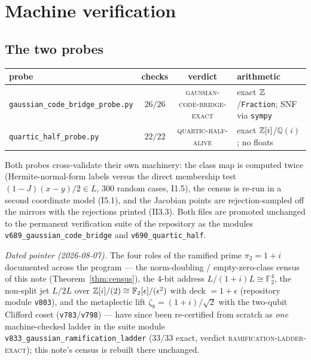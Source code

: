\section{Machine verification}\label{sec:verification}

\subsection{The two probes}
\begin{center}
\footnotesize
\setlength{\tabcolsep}{4pt}
\begin{tabular}{@{}lccl@{}}
\toprule
probe & checks & verdict & arithmetic\\
\midrule
\texttt{gaussian\_code\_bridge\_probe.py} & $26/26$ &
\textsc{gaussian-code-bridge-exact} &
exact $\mathbb Z$/\texttt{Fraction}; SNF via \texttt{sympy}\\
\texttt{quartic\_half\_probe.py} & $22/22$ &
\textsc{quartic-half-alive} &
exact $\mathbb Z[i]$/$\mathbb Q(i)$; no floats\\
\bottomrule
\end{tabular}
\end{center}
Both probes cross-validate their own machinery: the class map is
computed twice (Hermite-normal-form labels versus the direct
membership test $(1-J)(x-y)/2\in L$, $300$ random cases, I1.5), the
census is re-run in a second coordinate model (I5.1), and the
Jacobian points are rejection-sampled off the mirrors with the
rejections printed (II3.3).  Both files are promoted unchanged to the
permanent verification suite of the repository \cite{TFPT} as the
modules \texttt{v689\_gaussian\_code\_bridge} and
\texttt{v690\_quartic\_half}.

\emph{Dated pointer (2026-08-07).}  The four roles of the ramified
prime $\pi_2=1+i$ documented across the program --- the norm-doubling
/ empty-zero-class census of this note (Theorem~\ref{thm:census}),
the $4$-bit address $L/(1+i)L\cong\mathbb F_2^4$, the non-split jet
$L/2L$ over $\mathbb Z[i]/(2)\cong\mathbb F_2[\epsilon]/(\epsilon^2)$ with
deck $=1+\epsilon$ (repository module \texttt{v803}), and the
metaplectic lift $\zeta_8=(1+i)/\sqrt2$ with the two-qubit Clifford
coset (\texttt{v783}/\texttt{v798}) --- have since been re-certified
from scratch as \emph{one} machine-checked ladder in the suite module
\texttt{v833\_gaussian\_ramification\_ladder} ($33/33$ exact,
verdict \textsc{ramification-ladder-exact}); this note's census is
rebuilt there unchanged.

